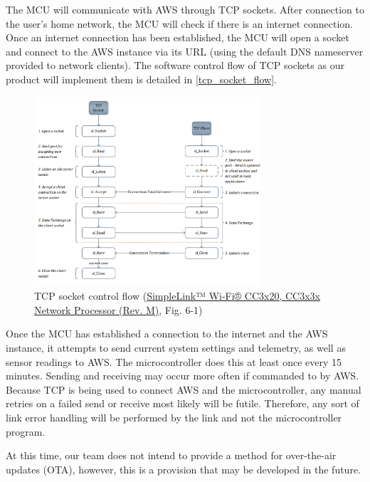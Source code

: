 \begin{flushleft}
    The MCU will communicate with AWS through TCP sockets. After connection to
    the user's home network, the MCU will check if there is an internet
    connection. Once an internet connection has been established, the MCU will
    open a socket and connect to the AWS instance via its URL (using the
    default DNS nameserver provided to network clients). The software control
    flow of TCP sockets as our product will implement them is detailed in
    \autoref{tcp_socket_flow}.
    \begin{figure}[H]
        \caption{TCP socket control flow (\href{https://www.ti.com/lit/ds/symlink/cc3220s.pdf}{SimpleLink™ Wi-Fi® CC3x20, CC3x3x Network Processor (Rev. M)}, Fig. 6-1)}
        \label{tcp_socket_flow}
        \centering
        \includegraphics[width=0.75\textwidth]{images/tcp_socket_flow.png}
    \end{figure}
\end{flushleft}
\begin{flushleft}
    Once the MCU has established a connection to the internet and the AWS
    instance, it attempts to send current system settings and telemetry, as
    well as sensor readings to AWS. The microcontroller does this at least
    once every 15 minutes. Sending and receiving may occur more often if
    commanded to by AWS. Because TCP is being used to connect AWS and the
    microcontroller, any manual retries on a failed send or receive most
    likely will be futile. Therefore, any sort of link error handling will
    be performed by the link and not the microcontroller program.
\end{flushleft}
\begin{flushleft}
    At this time, our team does not intend to provide a method for over-the-air
    updates (OTA), however, this is a provision that may be developed in the
    future.
\end{flushleft}
